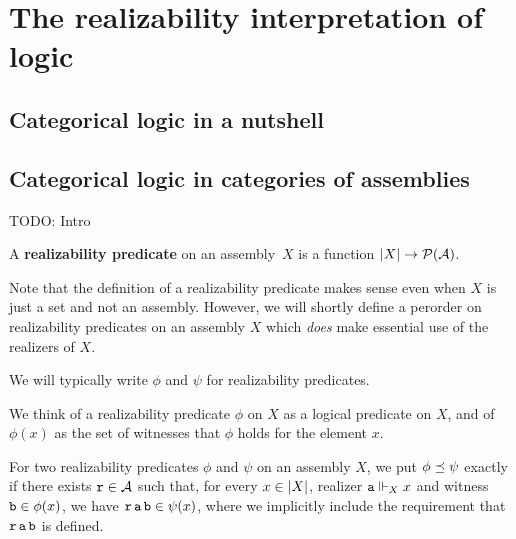 \chapter{The realizability interpretation of logic}\label{chap:logic}

\section{Categorical logic in a nutshell}

\cite{Lawvere1969}

\section{Categorical logic in categories of assemblies}\label{sec:cat-logic-in-asm}

\textcolor{Mulberry}{TODO: Intro}

\begin{definition}
  A \textbf{realizability predicate} on an assembly~\(X\) is a function
  \(\lvert X\rvert \to \mathcal P(\mathcal A)\).
\end{definition}

Note that the definition of a realizability predicate makes sense even when
\(X\) is just a set and not an assembly. However, we will shortly define a
perorder on realizability predicates on an assembly \(X\) which \emph{does} make
essential use of the realizers of \(X\).

\begin{notation}
  We will typically write \(\phi\) and \(\psi\) for realizability predicates.
\end{notation}

We think of a realizability predicate \(\phi\) on \(X\) as a logical predicate
on \(X\), and of \(\phi(x)\) as the set of witnesses that \(\phi\) holds for the
element \(x\).

\begin{definition}
  For two realizability predicates \(\phi\) and \(\psi\) on an assembly \(X\),
  we put \( \phi \preceq \psi \) exactly if there exists \(\operatorname{\mathtt{r}} \in \mathcal A\)
  such that, for every \(x \in \lvert X\rvert\), realizer \(\operatorname{\mathtt{a}} \Vdash_X x\)
  and witness \(\operatorname{\mathtt{b}} \in \phi(x)\), we have
  \(\operatorname{\mathtt{r}}\operatorname{\mathtt{a}}\operatorname{\mathtt{b}} \in \psi(x)\),
  where we implicitly include the requirement that \(\operatorname{\mathtt{r}}\operatorname{\mathtt{a}}\operatorname{\mathtt{b}}\) is defined.
\end{definition}

